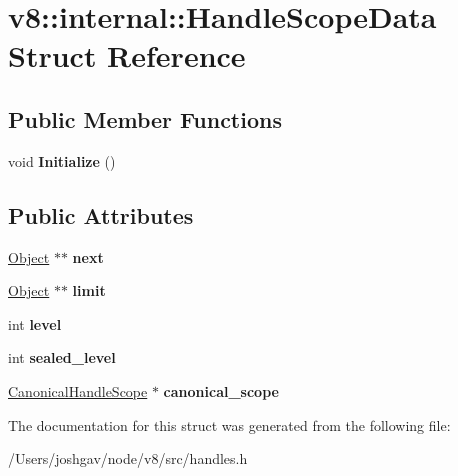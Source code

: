\hypertarget{structv8_1_1internal_1_1_handle_scope_data}{}\section{v8\+:\+:internal\+:\+:Handle\+Scope\+Data Struct Reference}
\label{structv8_1_1internal_1_1_handle_scope_data}
\subsection*{Public Member Functions}
\begin{DoxyCompactItemize}
\item 
void {\bfseries Initialize} ()\hypertarget{structv8_1_1internal_1_1_handle_scope_data_aea891abe1d0d28f81e9fda6601e6e89b}{}\label{structv8_1_1internal_1_1_handle_scope_data_aea891abe1d0d28f81e9fda6601e6e89b}

\end{DoxyCompactItemize}
\subsection*{Public Attributes}
\begin{DoxyCompactItemize}
\item 
\hyperlink{classv8_1_1internal_1_1_object}{Object} $\ast$$\ast$ {\bfseries next}\hypertarget{structv8_1_1internal_1_1_handle_scope_data_a0bacd17a5a20a2a2d46f2593924a825d}{}\label{structv8_1_1internal_1_1_handle_scope_data_a0bacd17a5a20a2a2d46f2593924a825d}

\item 
\hyperlink{classv8_1_1internal_1_1_object}{Object} $\ast$$\ast$ {\bfseries limit}\hypertarget{structv8_1_1internal_1_1_handle_scope_data_a272da862d84692a9c0597272dec51abe}{}\label{structv8_1_1internal_1_1_handle_scope_data_a272da862d84692a9c0597272dec51abe}

\item 
int {\bfseries level}\hypertarget{structv8_1_1internal_1_1_handle_scope_data_a3a33780c9478043e290d0e878ab5d485}{}\label{structv8_1_1internal_1_1_handle_scope_data_a3a33780c9478043e290d0e878ab5d485}

\item 
int {\bfseries sealed\+\_\+level}\hypertarget{structv8_1_1internal_1_1_handle_scope_data_a637cbbd70c56a059f439240782914927}{}\label{structv8_1_1internal_1_1_handle_scope_data_a637cbbd70c56a059f439240782914927}

\item 
\hyperlink{classv8_1_1internal_1_1_canonical_handle_scope}{Canonical\+Handle\+Scope} $\ast$ {\bfseries canonical\+\_\+scope}\hypertarget{structv8_1_1internal_1_1_handle_scope_data_a72e6ff5975bf82e20ac23f61415360ed}{}\label{structv8_1_1internal_1_1_handle_scope_data_a72e6ff5975bf82e20ac23f61415360ed}

\end{DoxyCompactItemize}


The documentation for this struct was generated from the following file\+:\begin{DoxyCompactItemize}
\item 
/\+Users/joshgav/node/v8/src/handles.\+h\end{DoxyCompactItemize}
